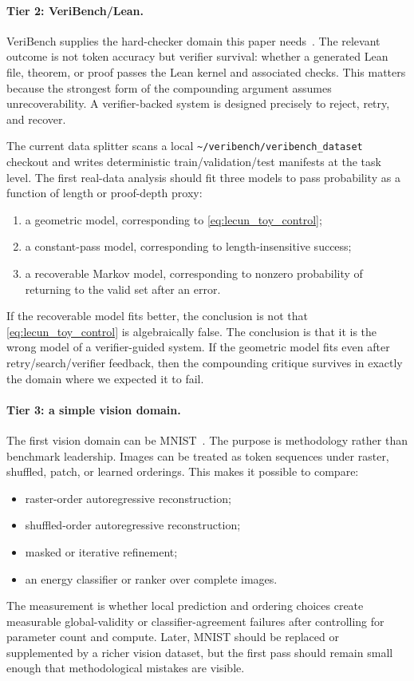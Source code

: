 \paragraph{Tier 2: VeriBench/Lean.}
VeriBench supplies the hard-checker domain this paper needs~\citep{daruru2024veribench,moura2021lean}.
The relevant outcome is not token accuracy but verifier survival: whether a generated Lean file, theorem, or proof passes the Lean kernel and associated checks.
This matters because the strongest form of the compounding argument assumes unrecoverability.
A verifier-backed system is designed precisely to reject, retry, and recover.

The current data splitter scans a local \texttt{\textasciitilde/veribench/veribench\_dataset} checkout and writes deterministic train/validation/test manifests at the task level.
The first real-data analysis should fit three models to pass probability as a function of length or proof-depth proxy:
\begin{enumerate}[leftmargin=2em]
  \item a geometric model, corresponding to \cref{eq:lecun_toy_control};
  \item a constant-pass model, corresponding to length-insensitive success;
  \item a recoverable Markov model, corresponding to nonzero probability of returning to the valid set after an error.
\end{enumerate}
If the recoverable model fits better, the conclusion is not that \cref{eq:lecun_toy_control} is algebraically false.
The conclusion is that it is the wrong model of a verifier-guided system.
If the geometric model fits even after retry/search/verifier feedback, then the compounding critique survives in exactly the domain where we expected it to fail.

\paragraph{Tier 3: a simple vision domain.}
The first vision domain can be \textsc{MNIST}~\citep{lecun1998gradient}.
The purpose is methodology rather than benchmark leadership.
Images can be treated as token sequences under raster, shuffled, patch, or learned orderings.
This makes it possible to compare:
\begin{itemize}
  \item raster-order autoregressive reconstruction;
  \item shuffled-order autoregressive reconstruction;
  \item masked or iterative refinement;
  \item an energy classifier or ranker over complete images.
\end{itemize}
The measurement is whether local prediction and ordering choices create measurable global-validity or classifier-agreement failures after controlling for parameter count and compute.
Later, MNIST should be replaced or supplemented by a richer vision dataset, but the first pass should remain small enough that methodological mistakes are visible.

